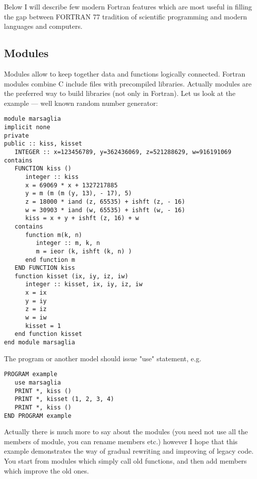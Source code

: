 \documentclass[a4paper]{article}
\begin{document}
Below I will describe few modern Fortran features which are most useful in filling the gap between FORTRAN 77 tradition of scientific programming and modern  languages and computers.
\subsection{Modules}
Modules allow to keep together data and functions logically connected. Fortran modules combine C include files with precompiled libraries. Actually modules are the preferred way to build libraries (not only in Fortran). Let us look at the example --- well known random number generator:
\begin{verbatim}
module marsaglia
implicit none
private
public :: kiss, kisset
   INTEGER :: x=123456789, y=362436069, z=521288629, w=916191069
contains
   FUNCTION kiss ()
      integer :: kiss
      x = 69069 * x + 1327217885
      y = m (m (m (y, 13), - 17), 5)
      z = 18000 * iand (z, 65535) + ishft (z, - 16)
      w = 30903 * iand (w, 65535) + ishft (w, - 16)
      kiss = x + y + ishft (z, 16) + w
   contains
      function m(k, n)
         integer :: m, k, n
         m = ieor (k, ishft (k, n) )
      end function m
   END FUNCTION kiss
   function kisset (ix, iy, iz, iw)
      integer :: kisset, ix, iy, iz, iw
      x = ix
      y = iy
      z = iz
      w = iw
      kisset = 1
   end function kisset
end module marsaglia
\end{verbatim}
The program or another model should issue "use" statement, e.g. 
\begin{verbatim}
PROGRAM example
   use marsaglia
   PRINT *, kiss ()
   PRINT *, kisset (1, 2, 3, 4)
   PRINT *, kiss ()
END PROGRAM example
\end{verbatim}
Actually there is much more to say about the modules (you need not use all the members of module,
you can rename members etc.) however I hope that this example demonstrates the way of gradual rewriting
and improving of legacy code. You start from modules which simply call old functions, and then add members
which improve the old ones.
\end{document}
